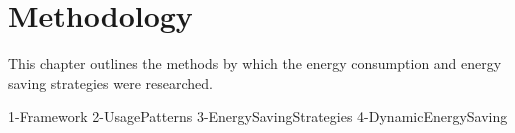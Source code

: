\chapter{Methodology}
    This chapter outlines the methods by which the energy consumption and energy saving strategies were researched.

    {1-Framework}
    {2-UsagePatterns}
    {3-EnergySavingStrategies}
    {4-DynamicEnergySaving}